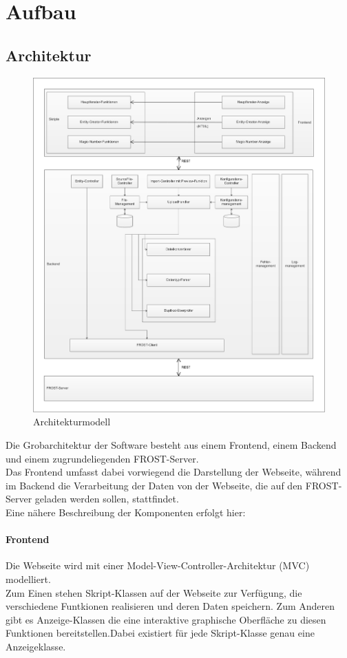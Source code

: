 \section{Aufbau}

\subsection{Architektur}
\begin{figure}[htbp]
\centering
\includegraphics[scale=0.44]{uml/eps/architektur.eps}
\caption{\label{fig:architektur} Architekturmodell}
\end{figure}
\noindent Die Grobarchitektur der Software besteht aus einem Frontend, einem Backend und einem zugrundeliegenden FROST-Server.\\
 Das Frontend umfasst dabei vorwiegend die Darstellung der Webseite, während im Backend die Verarbeitung der Daten von der Webseite, die auf den FROST-Server geladen werden sollen, stattfindet. \\
 Eine nähere Beschreibung der Komponenten erfolgt hier:

\paragraph{Frontend}
Die Webseite wird mit einer Model-View-Controller-Architektur (MVC) modelliert.\\
Zum Einen stehen Skript-Klassen auf der Webseite zur Verfügung, die verschiedene Funtkionen realisieren und deren Daten speichern.
Zum Anderen gibt es Anzeige-Klassen die eine interaktive graphische Oberfläche zu diesen Funktionen bereitstellen.Dabei existiert für jede Skript-Klasse genau eine Anzeigeklasse.

